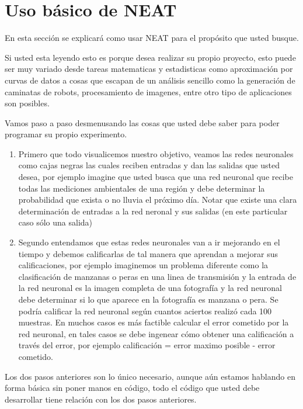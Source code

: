 \newpage
\section{Uso básico de NEAT}

En esta sección se explicará como usar NEAT para el propósito que usted busque.\newline

Si usted esta leyendo esto es porque desea realizar su propio proyecto, esto puede ser muy variado desde tareas matematicas y estadisticas como aproximación por curvas de datos a cosas que escapan de un análisis sencillo como la generación de caminatas de robots, procesamiento de imagenes, entre otro tipo de aplicaciones son posibles. \newline

Vamos paso a paso desmenusando las cosas que usted debe saber para poder programar su propio experimento.

\begin{enumerate}
\item Primero que todo visualicemos nuestro objetivo, veamos las redes neuronales como cajas negras las cuales reciben entradas y dan las salidas que usted desea, por ejemplo imagine que usted busca que una red neuronal que recibe todas las mediciones ambientales de una región y debe determinar la probabilidad que exista o no lluvia el próximo día. Notar que existe una clara determinación de entradas a la red neronal y sus salidas (en este particular caso sólo una salida)

\item Segundo entendamos que estas redes neuronales van a ir mejorando en el tiempo y debemos calificarlas de tal manera que aprendan a mejorar sus calificaciones, por ejemplo imaginemos un problema diferente como la clasificación de manzanas o peras en una linea de transmisión y la entrada de la red neuronal es la imagen completa de una fotografía y la red neuronal debe determinar si lo que aparece en la fotografía es manzana o pera. Se podría calificar la red neuronal según cuantos aciertos realizó cada 100 muestras. En muchos casos es más factible calcular el error cometido por la red neuronal, en tales casos se debe ingenear cómo obtener una calificación a través del error, por ejemplo calificación = error maximo posible - error cometido. 

\end{enumerate}

Los dos pasos anteriores son lo único necesario, aunque aún estamos hablando en forma básica sin poner manos en código, todo el código que usted debe desarrollar tiene relación con los dos pasos anteriores. 


